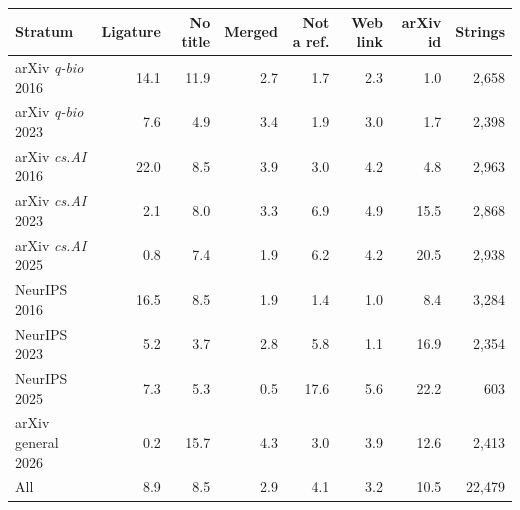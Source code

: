 \begin{tabular}{lrrrrrrr}
\toprule
\textbf{Stratum} & \textbf{Ligature} & \textbf{No title} & \textbf{Merged} & \textbf{Not a ref.} & \textbf{Web link} & \textbf{arXiv id} & \textbf{Strings} \\
\midrule
arXiv \textit{q-bio} 2016 & 14.1 & 11.9 & 2.7 & 1.7 & 2.3 & 1.0 & 2{,}658 \\
arXiv \textit{q-bio} 2023 & 7.6 & 4.9 & 3.4 & 1.9 & 3.0 & 1.7 & 2{,}398 \\
arXiv \textit{cs.AI} 2016 & 22.0 & 8.5 & 3.9 & 3.0 & 4.2 & 4.8 & 2{,}963 \\
arXiv \textit{cs.AI} 2023 & 2.1 & 8.0 & 3.3 & 6.9 & 4.9 & 15.5 & 2{,}868 \\
arXiv \textit{cs.AI} 2025 & 0.8 & 7.4 & 1.9 & 6.2 & 4.2 & 20.5 & 2{,}938 \\
NeurIPS 2016 & 16.5 & 8.5 & 1.9 & 1.4 & 1.0 & 8.4 & 3{,}284 \\
NeurIPS 2023 & 5.2 & 3.7 & 2.8 & 5.8 & 1.1 & 16.9 & 2{,}354 \\
NeurIPS 2025 & 7.3 & 5.3 & 0.5 & 17.6 & 5.6 & 22.2 & 603 \\
arXiv general 2026 & 0.2 & 15.7 & 4.3 & 3.0 & 3.9 & 12.6 & 2{,}413 \\
\midrule
All & 8.9 & 8.5 & 2.9 & 4.1 & 3.2 & 10.5 & 22{,}479 \\
\bottomrule
\end{tabular}
